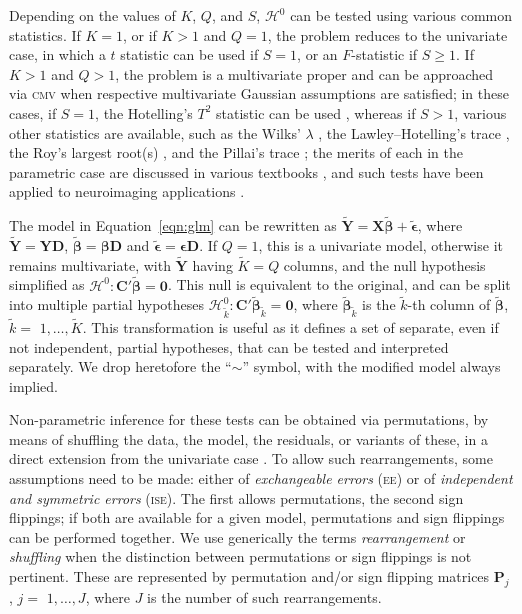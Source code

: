 Depending on the values of $K$, $Q$, and $S$, $\mathcal{H}^0$ can be tested using various common statistics. If $K=1$, or if $K>1$ and $Q=1$, the problem reduces to the univariate case, in which a $t$ statistic can be used if $S=1$, or an $F$-statistic if $S \geqslant 1$. If $K>1$ and $Q>1$, the problem is a multivariate proper and can be approached via \textsc{cmv} when respective multivariate Gaussian assumptions are satisfied; in these cases, if $S = 1$, the Hotelling's $T^2$ statistic can be used \citep{Hotelling1931}, whereas if $S>1$, various other statistics are available, such as the Wilks' $\lambda$ \citep{Wilks1932}, the Lawley--Hotelling's trace \citep{Lawley1938, Hotelling1951}, the Roy's largest root(s) \citep{Roy1953, Kuhfeld1986}, and the Pillai's trace \citep{Pillai1955}; the merits of each in the parametric case are discussed in various textbooks \citep[e.g.,][]{Christensen2001, Timm2002, Anderson2003, Johnson2007}, and such tests have been applied to neuroimaging applications \citep{Chen2014}.

The model in Equation~\ref{eqn:glm} can be rewritten as $\tilde{\mathbf{Y}} = \mathbf{X}\tilde{\boldsymbol{\beta}} + \tilde{\boldsymbol{\epsilon}}$, where $\tilde{\mathbf{Y}}=\mathbf{Y}\mathbf{D}$, $\tilde{\boldsymbol{\beta}}=\boldsymbol{\beta}\mathbf{D}$ and $\tilde{\boldsymbol{\epsilon}}=\boldsymbol{\epsilon}\mathbf{D}$. If $Q=1$, this is a univariate model, otherwise it remains multivariate, with $\tilde{\mathbf{Y}}$ having $\tilde{K}=Q$ columns, and the null hypothesis simplified as $\mathcal{H}^{0} : \mathbf{C}'\tilde{\boldsymbol{\beta}} = \boldsymbol{0}$. This null is equivalent to the original, and can be split into multiple partial hypotheses $\mathcal{H}^{0}_{\tilde{k}} : \mathbf{C}'\tilde{\boldsymbol{\beta}}_{\tilde{k}} = \boldsymbol{0}$, where $\tilde{\boldsymbol{\beta}}_{\tilde{k}}$ is the $\tilde{k}$-th column of $\tilde{\boldsymbol{\beta}}$, $\tilde{k} =$ $1, \ldots , \tilde{K}$. This transformation is useful as it defines a set of separate, even if not independent, partial hypotheses, that can be tested and interpreted separately. We drop heretofore the ``$\sim$'' symbol, with the modified model always implied.

Non-parametric inference for these tests can be obtained via permutations, by means of shuffling the data, the model, the residuals, or variants of these, in a direct extension from the univariate case \citep[Table~2]{Winkler2014}. To allow such rearrangements, some assumptions need to be made: either of \emph{exchangeable errors} (\textsc{ee}) or of \emph{independent and symmetric errors} (\textsc{ise}). The first allows permutations, the second sign flippings; if both are available for a given model, permutations and sign flippings can be performed together. We use generically the terms \emph{rearrangement} or \emph{shuffling} when the distinction between permutations or sign flippings is not pertinent. These are represented by permutation and/or sign flipping matrices $\mathbf{P}_{j}$, $j =$ $1, \ldots , J$, where $J$ is the number of such rearrangements.

